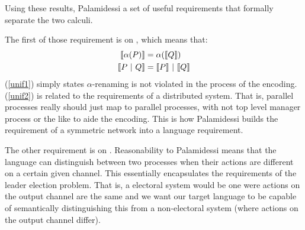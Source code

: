 Using these results, Palamidessi a set of useful requirements that formally separate the two calculi.

The first of those requirement is on , which means that:
\begin{align}
	\llbracket{\alpha(P)}\rrbracket &= \alpha(\llbracket{Q}\rrbracket)\label{unif1}\\
	\llbracket{P \ensuremath{\ |\ } Q}\rrbracket &= \llbracket{P}\rrbracket \ |\  \llbracket{Q}\rrbracket\label{unif2}
\end{align}
(\ref{unif1}) simply states $\alpha$-renaming  is not violated in the process of the encoding.  (\ref{unif2}) is related to the requirements of a distributed system.  That is, parallel processes really should just map to parallel processes, with not top level manager process or the like to aide the encoding.  This is how Palamidessi builds the requirement of a symmetric network into a language requirement.

The other requirement is on .  Reasonability to Palamidessi means that the language can distinguish between two processes when their actions are different on a certain given channel.  This essentially encapsulates the requirements of the leader election problem.  That is, a electoral system would be one were actions on the output channel are the same and we want our target language to be capable of semantically distinguishing this from a non-electoral system (where actions on the output channel differ).
